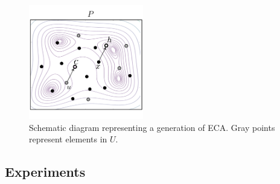 \documentclass{svproc}
\begin{document}
\begin{figure}[!ht]
	\centering
	\includegraphics[width=5cm]{img/ecaG.pdf}
	\caption{Schematic diagram representing a generation of ECA. Gray points %
	represent elements in $U$.}
	\label{fig:ecag}       %
\end{figure}

\subsection{Experiments} %
\label{sub:experiments}
\end{document}
